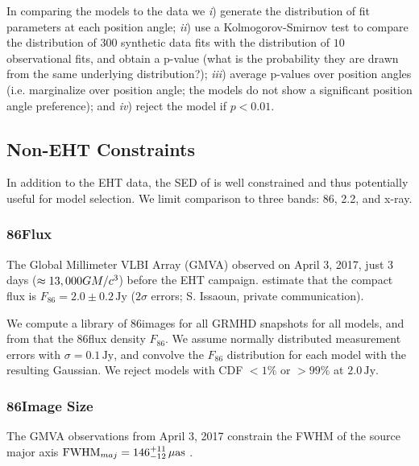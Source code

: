In comparing the models to the data we
\emph{i}) generate the distribution of fit parameters at each position angle;
\emph{ii}) use a Kolmogorov-Smirnov test to compare the distribution of $300$ synthetic data fits with the distribution of $10$ observational fits, and obtain a p-value (what is the probability they are drawn from the same underlying distribution?);
\emph{iii}) average p-values over position angles (i.e. marginalize over position angle; the models do not show a significant position angle preference); and
\emph{iv}) reject the model if $p < 0.01$.

\subsection{Non-EHT Constraints}

In addition to the EHT data, the SED of \sgra is well constrained  and thus potentially useful for model selection.
We limit comparison to three bands: 86\GHz, 2.2\um, and x-ray.

\subsubsection{86\GHz Flux}

The Global Millimeter VLBI Array (GMVA) observed \sgra on April 3, 2017, just 3 days ($\approx 13,000 GM/c^3$) before the EHT campaign.
\citet{2019ApJ...871...30I} estimate that the compact flux is $F_{86}=2.0 \pm 0.2\,\mathrm{Jy}$ ($2\sigma$ errors; S. Issaoun, private communication).

We compute a library of 86\GHz images for all GRMHD snapshots for all models, and from that the 86\GHz flux density $F_{86}$.  We assume normally distributed measurement errors with $\sigma = 0.1\,\mathrm{Jy}$, and convolve the $F_{86}$ distribution for each model with the resulting Gaussian.  We reject models with CDF $< 1\%$ or $> 99\%$ at $2.0\,\mathrm{Jy}$.

\subsubsection{86\GHz Image Size}

The GMVA observations from April 3, 2017 constrain the FWHM of the source major axis ${\rm FWHM}_{maj} = 146^{+11}_{-12}\,\mathrm{\mu as}$ \citep[95\% confidence][]{2021ApJ...915...99I}.

